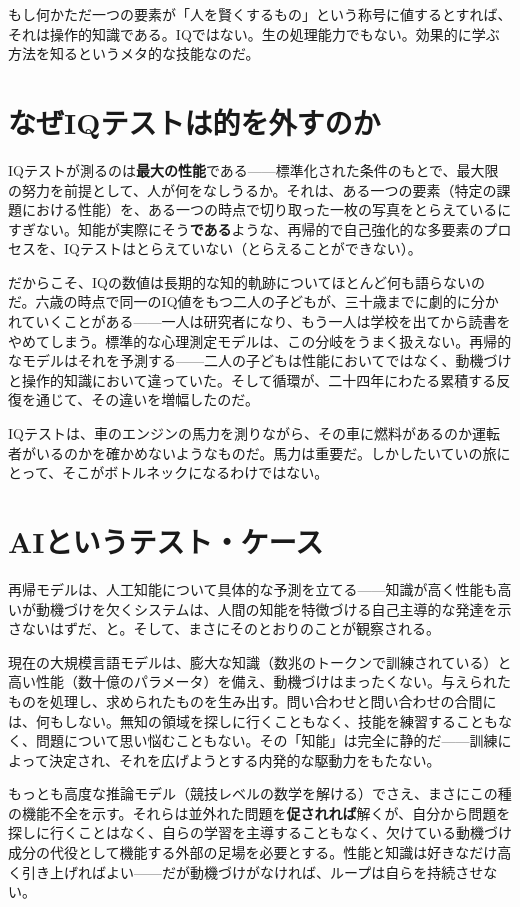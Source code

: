 \documentclass[11pt, twoside, openright]{book}
\begin{document}
もし何かただ一つの要素が「人を賢くするもの」という称号に値するとすれば、それは操作的知識である。IQではない。生の処理能力でもない。効果的に学ぶ方法を知るというメタ的な技能なのだ。

\section*{なぜIQテストは的を外すのか}

IQテストが測るのは\textbf{最大の性能}である------標準化された条件のもとで、最大限の努力を前提として、人が何をなしうるか。それは、ある一つの要素（特定の課題における性能）を、ある一つの時点で切り取った一枚の写真をとらえているにすぎない。知能が実際にそう\textbf{である}ような、再帰的で自己強化的な多要素のプロセスを、IQテストはとらえていない（とらえることができない）。

だからこそ、IQの数値は長期的な知的軌跡についてほとんど何も語らないのだ。六歳の時点で同一のIQ値をもつ二人の子どもが、三十歳までに劇的に分かれていくことがある------一人は研究者になり、もう一人は学校を出てから読書をやめてしまう。標準的な心理測定モデルは、この分岐をうまく扱えない。再帰的なモデルはそれを予測する------二人の子どもは性能においてではなく、動機づけと操作的知識において違っていた。そして循環が、二十四年にわたる累積する反復を通じて、その違いを増幅したのだ。

IQテストは、車のエンジンの馬力を測りながら、その車に燃料があるのか運転者がいるのかを確かめないようなものだ。馬力は重要だ。しかしたいていの旅にとって、そこがボトルネックになるわけではない。

\section*{AIというテスト・ケース}

再帰モデルは、人工知能について具体的な予測を立てる------知識が高く性能も高いが動機づけを欠くシステムは、人間の知能を特徴づける自己主導的な発達を示さないはずだ、と。そして、まさにそのとおりのことが観察される。

現在の大規模言語モデルは、膨大な知識（数兆のトークンで訓練されている）と高い性能（数十億のパラメータ）を備え、動機づけはまったくない。与えられたものを処理し、求められたものを生み出す。問い合わせと問い合わせの合間には、何もしない。無知の領域を探しに行くこともなく、技能を練習することもなく、問題について思い悩むこともない。その「知能」は完全に静的だ------訓練によって決定され、それを広げようとする内発的な駆動力をもたない。

もっとも高度な推論モデル（競技レベルの数学を解ける）でさえ、まさにこの種の機能不全を示す。それらは並外れた問題を\textbf{促されれば}解くが、自分から問題を探しに行くことはなく、自らの学習を主導することもなく、欠けている動機づけ成分の代役として機能する外部の足場を必要とする。性能と知識は好きなだけ高く引き上げればよい------だが動機づけがなければ、ループは自らを持続させない。
\end{document}
